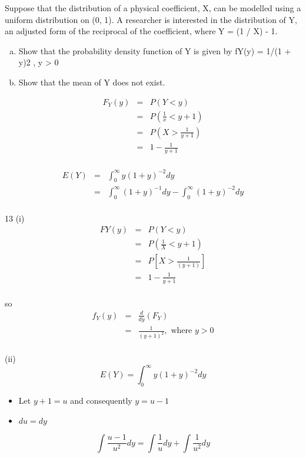 \documentclass[a4paper,12pt]{article}
\begin{document}
Suppose that the distribution of a physical coefficient, X, can be modelled
using a uniform distribution on (0, 1). A researcher is interested in the
distribution of Y, an adjusted form of the reciprocal of the coefficient, where Y
= (1 / X) - 1.
\begin{enumerate}[(a)]
\item Show that the probability density function of Y is given by
fY(y) = 1/(1 + y)2 , y > 0 
\item Show that the mean of Y does not exist. 
\end{enumerate}



\begin{eqnarray*}
F_Y(y) &=& P(Y < y) \\
&=& P( \frac{1}{x} < y+1 )\\
&=& P(X > \frac{1}{y+1}) \\
&=& 1 - \frac{1}{y+1}\\
\end{eqnarray*}

\begin{eqnarray*}
E(Y) &=& \int^{\infty}_{0} y(1+y)^{-2} dy \\
&=& \int^{\infty}_{0} (1+y)^{-1} dy  -  \int^{\infty}_{0} (1+y)^{-2} dy \\
\end{eqnarray*}


13
(i) 
\begin{eqnarray*} F Y (y) &=& P(Y < y) \\ 
&=& P(\frac{1}{X} < y + 1) \\ 
&=& P[X > \frac{1}{(y + 1)}] \\ 
&=& 1 - \frac{1}{y + 1}\\ 
\end{eqnarray*}

so 
\begin{eqnarray*}
f_Y (y) 
&=& \frac{d}{dy} \left( F_Y  \right) \\ 
&=& \frac{1}{(y + 1)^2} , \mbox{ where } y > 0\\
\end{eqnarray*}

(ii) \[E(Y) = \int^{\infty}_{0} y(1+y)^{-2} dy \]

\begin{framed}
\begin{itemize}
\item Let $y+1 = u$ and consequently $y = u-1$
\item $du = dy$
\end{itemize}
\[\int\frac{u-1}{u^2} dy = \int\frac{1}{u} dy + \int\frac{1}{u^2} dy\]

\end{framed}
\end{document}
